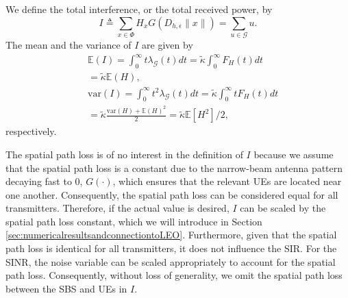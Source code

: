 \documentclass[lettersize,journal]{IEEEtran}
\begin{document}
We define the total interference, or the total received power, by
\begin{equation}
  \label{eq:totpow}
  I \triangleq \sum\limits_{x \in \Phi} H_x G(D_{h,\epsilon}\|x\|)=\sum\limits_{u \in \mathcal{G}} u.
\end{equation}
The mean and the variance of $I$ are given by
\begin{align}
  \label{eq:totmean}
  &\mathbb{E}\left(I \right) = \int_{0}^{\infty} t\lambda_{\mathcal{G}}(t) dt = \tilde{\kappa} \int_{0}^{\infty}F_H(t) dt \nonumber \\
  &=\tilde{\kappa} \mathbb{E}(H), \\\
  \label{eq:totvar}
  &\text{var}\left(I \right) = \int_{0}^{\infty} t^2\lambda_{\mathcal{G}}(t) dt= \tilde{\kappa} \int_0^{\infty}tF_H(t) dt  \nonumber \\
  &= \tilde{\kappa} \frac{\text{var}(H) + \mathbb{E}(H)^2}{2} = \tilde{\kappa}  \mathbb{E}[H^2]/2,
\end{align}
respectively.

The spatial path loss is of no interest in the definition of $I$ because we assume that the spatial path loss is a constant due to the narrow-beam antenna pattern decaying fast to $0$, $G(\cdot)$, which ensures that the relevant UEs are located near one another. Consequently, the spatial path loss can be considered equal for all transmitters. Therefore, if the actual value is desired, $I$ can be scaled by the spatial path loss constant, which we will introduce in Section \ref{sec:numericalresultsandconnectiontoLEO}. Furthermore, given that the spatial path loss is identical for all transmitters, it does not influence the SIR. For the SINR, the noise variable can be scaled appropriately to account for the spatial path loss. Consequently, without loss of generality, we omit the spatial path loss between the SBS and UEs in $I$.
\end{document}
